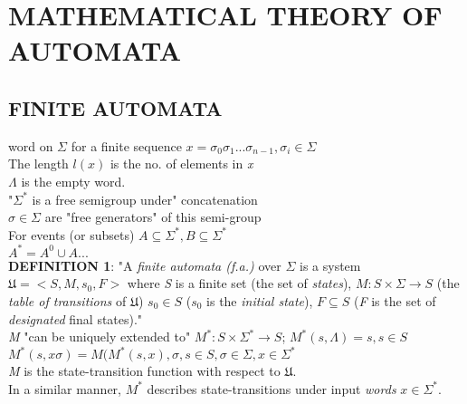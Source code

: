 
\renewcommand{\thesubsection}{\Roman{subsection}}

\section{MATHEMATICAL THEORY OF AUTOMATA}

\subsection{FINITE AUTOMATA}
word on $\Sigma$
for a finite sequence $x=\sigma_{0}\sigma_{1}...\sigma_{n-1}, \sigma_{i} \in \Sigma$\\
The length $l(x)$ is the no. of elements in \textit{x}\\
$\Lambda$ is the empty word.\\
"$\Sigma^{*}$ is a free semigroup under" concatenation\\
$\sigma \in \Sigma$ are "free generators" of this semi-group\\
For events (or subsets) $A \subseteq \Sigma^{*}, B \subseteq \Sigma^{*}$\\
$A^{*} = A^{0} \cup A ...$\\

\textbf{DEFINITION 1}:
"A \textit{finite automata (f.a.)} over $\Sigma$ is a system $\mathfrak{U} = < S, M, s_0, F>$ 
where \textit{S} is a finite set (the set of \textit{states}), $M: S \times \Sigma \to S$ (the \textit{table of transitions} of $\mathfrak{U}$) 
$s_0 \in S$ ($s_0$ is the \textit{initial state}), $F \subseteq S$ (\textit{F} is the set of \textit{designated} final states)."\\

\textit{M} "can be uniquely extended to" $M^{*}: S \times \Sigma^{*} \to S$; $M^{*}(s, \Lambda) = s, s \in S$\\
$M^{*}(s, x\sigma) = M(M^{*}(s,x), \sigma, s \in S, \sigma \in \Sigma, x \in \Sigma^{*}$\\

\textit{M} is the state-transition function with respect to  $\mathfrak{U}$.\\
In a similar manner, $M^{*}$ describes state-transitions under input \textit{words} $x \in \Sigma^{*}$.\\

